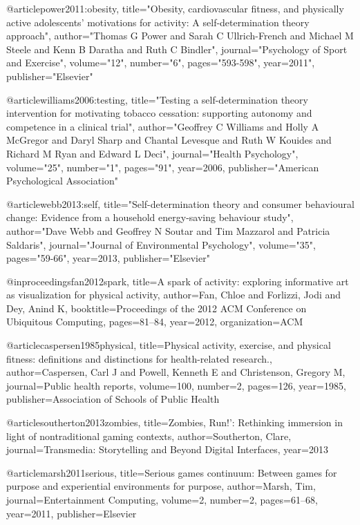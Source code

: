 @article{power2011:obesity,
  title="Obesity, cardiovascular fitness, and physically active adolescents' motivations for activity: A self-determination theory approach",
  author="Thomas G Power and Sarah C Ullrich-French and Michael M Steele and Kenn B Daratha and Ruth C Bindler",
  journal="Psychology of Sport and Exercise",
  volume="12",
  number="6",
  pages="593-598",
  year={2011}",
  publisher="Elsevier"
}

@article{williams2006:testing,
  title="Testing a self-determination theory intervention for motivating tobacco cessation: supporting autonomy and competence in a clinical trial",
  author="Geoffrey C Williams and Holly A McGregor and Daryl Sharp and Chantal Levesque and Ruth W Kouides and Richard M Ryan and Edward L Deci",
  journal="Health Psychology",
  volume="25",
  number="1",
  pages="91",
  year={2006},
  publisher="American Psychological Association"
}

@article{webb2013:self,
  title="Self-determination theory and consumer behavioural change: Evidence from a household energy-saving behaviour study",
  author="Dave Webb and Geoffrey N Soutar and Tim Mazzarol and Patricia Saldaris",
  journal="Journal of Environmental Psychology",
  volume="35",
  pages="59-66",
  year={2013},
  publisher="Elsevier"
}

@inproceedings{fan2012spark,
  title={A spark of activity: exploring informative art as visualization for physical activity},
  author={Fan, Chloe and Forlizzi, Jodi and Dey, Anind K},
  booktitle={Proceedings of the 2012 ACM Conference on Ubiquitous Computing},
  pages={81--84},
  year={2012},
  organization={ACM}
}

@article{caspersen1985physical,
  title={Physical activity, exercise, and physical fitness: definitions and distinctions for health-related research.},
  author={Caspersen, Carl J and Powell, Kenneth E and Christenson, Gregory M},
  journal={Public health reports},
  volume={100},
  number={2},
  pages={126},
  year={1985},
  publisher={Association of Schools of Public Health}
}

@article{southerton2013zombies,
  title={Zombies, Run!’: Rethinking immersion in light of nontraditional gaming contexts},
  author={Southerton, Clare},
  journal={Transmedia: Storytelling and Beyond Digital Interfaces},
  year={2013}
}


@article{marsh2011serious,
  title={Serious games continuum: Between games for purpose and experiential environments for purpose},
  author={Marsh, Tim},
  journal={Entertainment Computing},
  volume={2},
  number={2},
  pages={61--68},
  year={2011},
  publisher={Elsevier}
}

